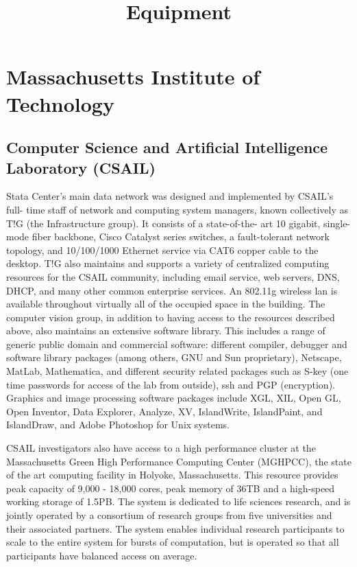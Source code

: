\documentclass[11pt]{amsart}
\title{Equipment}
\author{}
\date{}
\begin{document}
\maketitle
\hypertarget{x-massachusetts-institute-of-technology}{\section*{Massachusetts Institute of Technology}}
\hypertarget{x-computer-science-and-artificial-intelligence-laboratory-(csail)}{\subsection*{Computer Science and Artificial Intelligence Laboratory (CSAIL)}}
Stata Center’s main data network was designed and implemented by CSAIL’s full- time staff of network and computing system managers, known collectively as T!G (the Infrastructure group). It consists of a state-of-the- art 10 gigabit, single-mode fiber backbone, Cisco Catalyst series switches, a fault-tolerant network topology, and 10/100/1000 Ethernet service via CAT6 copper cable to the desktop. T!G also maintains and supports a variety of centralized computing resources for the CSAIL community, including email service, web servers, DNS, DHCP, and many other common enterprise services. An 802.11g wireless lan is available throughout virtually all of the occupied space in the building. The computer vision group, in addition to having access to the resources described above, also maintains an extensive software library. This includes a range of generic public domain and commercial software: different compiler, debugger and software library packages (among others, GNU and Sun proprietary), Netscape, MatLab, Mathematica, and different security related packages such as S-key (one time passwords for access of the lab from outside), ssh and PGP (encryption). Graphics and image processing software packages include XGL, XIL, Open GL, Open Inventor, Data Explorer, Analyze, XV, IslandWrite, IslandPaint, and IslandDraw, and Adobe Photoshop for Unix systems.


CSAIL investigators also have access to a high performance cluster at the Massachusetts Green High Performance Computing Center (MGHPCC), the state of the art computing facility in Holyoke, Massachusetts. This resource provides peak capacity of 9,000 - 18,000 cores, peak memory of 36TB and a high-speed working storage of 1.5PB. The system is dedicated to life sciences research, and is jointly operated by a consortium of research groups from five universities and their associated partners. The system enables individual research participants to scale to the entire system for bursts of computation, but is operated so that all participants have balanced access on
average.
\end{document}
